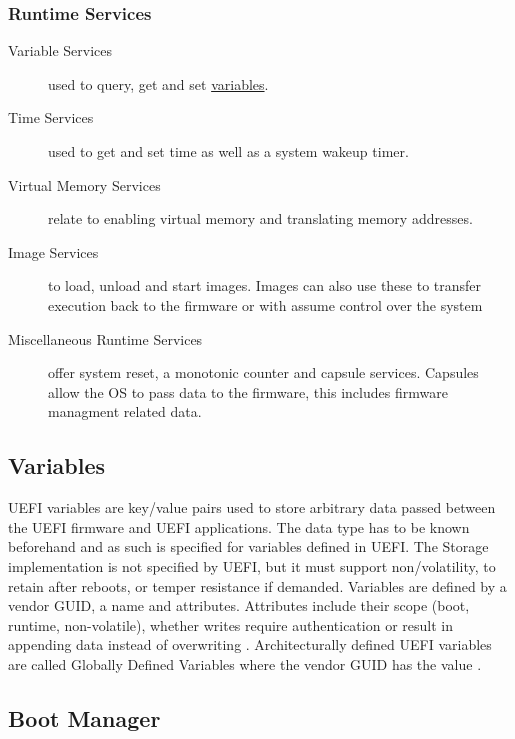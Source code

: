 \subsubsection{Runtime Services}


\begin{description}
    \item [Variable Services] used to query, get and set \hyperref[sec:uefi-pi:uefi:variables]{variables}.
    \item [Time Services] used to get and set time as well as a system wakeup timer.
    \item [Virtual Memory Services] relate to enabling virtual memory and translating memory addresses.
    \item [Image Services] to load, unload and start images. Images can also use these to transfer execution back to the firmware or with  assume control over the system
    \item [Miscellaneous Runtime Services] offer system reset, a monotonic counter and capsule services. Capsules allow the \ac{OS} to pass data to the firmware, this includes firmware managment related data.
\end{description}

\subsection{Variables}
\label{sec:uefi-pi:uefi:variables}

\ac{UEFI} variables are key/value pairs used to store arbitrary data passed between the \ac{UEFI} firmware and \ac{UEFI} applications.
The data type has to be known beforehand and as such is specified for variables defined in \ac{UEFI}.
The Storage implementation is not specified by \ac{UEFI}, but it must support non\-/volatility, to retain after reboots, or temper resistance if demanded.
Variables are defined by a vendor \ac{GUID}, a name and attributes.
Attributes include their scope (boot, runtime, non-volatile), whether writes require authentication or result in appending data instead of overwriting \cite[Section 8.2]{uefi-spec}.
Architecturally defined \ac{UEFI} variables are called Globally Defined Variables where the vendor \ac{GUID} has the value  \cite[Section 3.3]{uefi-spec}.

\subsection{Boot Manager}
\label{sec:uefi-pi:uefi:boot-manager}

